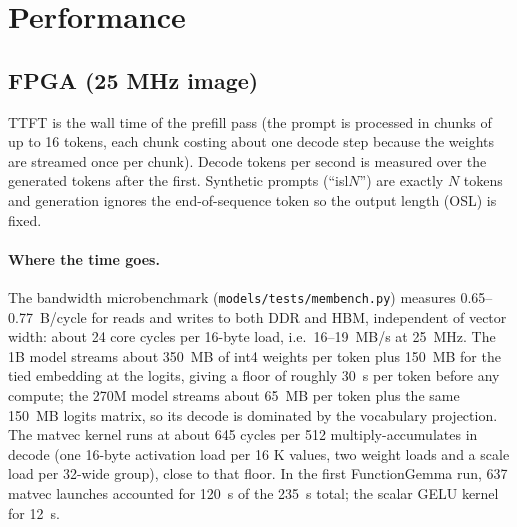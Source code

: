 \documentclass[11pt]{article}
\begin{document}
\begin{table}[H]\centering\footnotesize
\correctnesstable
\caption{Chat prompt output, FPGA native kernels versus MLX.}\label{tab:correct}
\end{table}

\section{Performance}
\subsection{FPGA (25 MHz image)}
TTFT is the wall time of the prefill pass (the prompt is processed in chunks of up to 16 tokens,
each chunk costing about one decode step because the weights are streamed once per chunk).
Decode tokens per second is measured over the generated tokens after the first.
Synthetic prompts (``isl$N$'') are exactly $N$ tokens and generation ignores the end-of-sequence
token so the output length (OSL) is fixed.

\begin{table}[H]\centering\footnotesize
\fpgatable
\caption{FPGA results. Entries marked ``in progress'' are regenerated when the runs finish.}\label{tab:fpga}
\end{table}

\paragraph{Where the time goes.} The bandwidth microbenchmark (\texttt{models/tests/membench.py})
measures 0.65--0.77~B/cycle for reads and writes to both DDR and HBM, independent of vector
width: about 24 core cycles per 16-byte load, i.e.\ 16--19~MB/s at 25~MHz. The 1B model streams
about 350~MB of int4 weights per token plus 150~MB for the tied embedding at the logits, giving a
floor of roughly 30~s per token before any compute; the 270M model streams about 65~MB per token
plus the same 150~MB logits matrix, so its decode is dominated by the vocabulary projection.
The matvec kernel runs at about 645 cycles per 512 multiply-accumulates in decode (one 16-byte
activation load per 16 K values, two weight loads and a scale load per 32-wide group), close to
that floor. In the first FunctionGemma run, 637 matvec launches accounted for 120~s of the 235~s
total; the scalar GELU kernel for 12~s.
\end{document}
